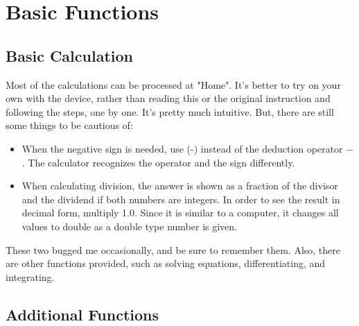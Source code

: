 \section{Basic Functions}

\subsection{Basic Calculation}
Most of the calculations can be processed at "Home". It's better to try on your own with the device, rather than reading this or the original instruction and following the steps, one by one. It's pretty much intuitive. But, there are still some things to be cautious of:

\begin{itemize}
    \item When the negative sign is needed, use (-) instead of the deduction operator $-$. The calculator recognizes the operator and the sign differently.

    \item When calculating division, the answer is shown as a fraction of the divisor and the dividend if both numbers are integers. In order to see the result in decimal form, multiply 1.0. Since it is similar to a computer, it changes all values to double as a double type number is given.
\end{itemize}

These two bugged me occasionally, and be sure to remember them. Also, there are other functions provided, such as solving equations, differentiating, and integrating.

\subsection{Additional Functions}
